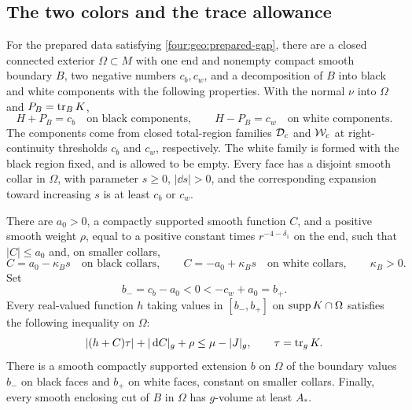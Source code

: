 \subsection{The two colors and the trace allowance}

\begin{proposition}\label{four:prop:geometric-preparation}
For the prepared data satisfying \eqref{four:geo:prepared-gap}, there are a
closed connected exterior $\Omega\subset M$ with one end and nonempty
compact smooth boundary $B$, two negative numbers $c_b,c_w$, and a
decomposition of $B$ into black and white components with the following
properties.  With the normal $\nu$ into $\Omega$ and $P_B=\operatorname{tr}_B K$,
\begin{equation}\label{four:geo:two-boundary-expansions}
 H+P_B=c_b\quad\text{on black components},\qquad
 H-P_B=c_w\quad\text{on white components}.
\end{equation}
The components come from closed total-region families $\mathcal D_c$ and $\mathcal W_c$
at right-continuity thresholds $c_b$ and $c_w$, respectively.  The white
family is formed with the black region fixed, and is allowed to be empty.
Every face has a disjoint smooth collar in $\Omega$, with parameter $s\ge0$,
$|\dd s|>0$, and the corresponding expansion toward increasing $s$ is
at least $c_b$ or $c_w$.

There are $a_0>0$, a compactly supported smooth function $C$, and a positive
smooth weight $\rho$, equal to a positive constant times
$r^{-4-\delta_1}$ on the end, such that $|C|\le a_0$ and, on smaller
collars,
\begin{equation}\label{four:geo:linear-offsets}
 C=a_0-\kappa_Bs\quad\text{on black collars},\qquad
 C=-a_0+\kappa_Bs\quad\text{on white collars},\qquad \kappa_B>0.
\end{equation}
Set
\begin{equation}\label{four:geo:height-endpoints}
 b_-=c_b-a_0<0< -c_w+a_0=b_+.
\end{equation}
Every real-valued function $h$ taking values in $[b_-,b_+]$ on
$\operatorname{supp} K\cap\Omega$ satisfies the following inequality on $\Omega$:
\begin{equation}\label{four:eq:trace-slack}
 |(h+C)\tau|+|\,\mathrm d C|_g+\rho\le\mu-|J|_g,
 \qquad \tau=\operatorname{tr}_g K.
\end{equation}
There is a smooth compactly supported extension $b$ on $\Omega$ of the
boundary values $b_-$ on black faces and $b_+$ on white faces, constant on
smaller collars.  Finally, every smooth enclosing cut of $B$ in $\Omega$
has $g$-volume at least $A_*$.
\end{proposition}

